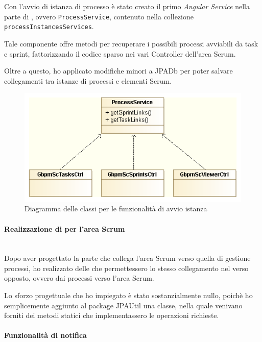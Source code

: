 Con l'avvio di istanza di processo è stato creato il primo \emph{Angular
Service} nella parte di \FREND{}, ovvero \texttt{ProcessService}, contenuto
nella collezione \texttt{processInstancesServices}.

Tale componente offre metodi per recuperare i possibili processi avviabili da
task e sprint, fattorizzando il codice sparso nei vari Controller dell'area
Scrum.

Oltre a questo, ho applicato modifiche minori a JPADb per poter salvare
collegamenti tra istanze di processi e elementi Scrum.

\begin{figure}[H]%
\centering
\includegraphics[width=.8\columnwidth]{immagini/ProcessService}
\caption{Diagramma delle classi per le funzionalità di avvio istanza}
\label{fig:inst-start-cd}%
\end{figure}

\paragraph{Realizzazione di  per l'area Scrum} \mbox{} \\

Dopo aver progettato la parte che collega l'area Scrum verso quella di gestione
processi, ho realizzato delle  che permettessero lo stesso
collegamento nel verso opposto, ovvero dai processi verso l'area Scrum.

Lo sforzo progettuale che ho impiegato è stato sostanzialmente nullo, poichè ho
semplicemente aggiunto al package JPAUtil una classe, nella quale venivano
forniti dei metodi statici che implementassero le operazioni richieste.

\paragraph{Funzionalità di notifica} \mbox{} \\

